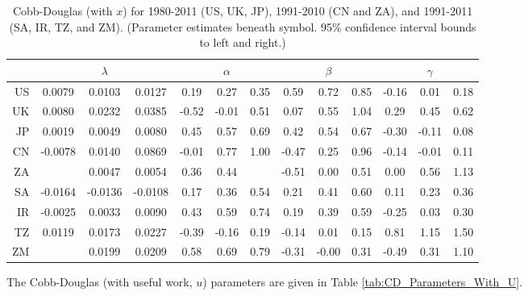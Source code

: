 \documentclass[preprint,authoryear,12pt]{elsarticle}\usepackage{graphicx, color}
\begin{document}
\begin{table}[H]
\begin{center}
\caption{Cobb-Douglas (with $x$) for 1980-2011 (US, UK, JP), 1991-2010 (CN and ZA), and 1991-2011 (SA, IR, TZ, and ZM). (Parameter estimates beneath symbol. 95\% confidence interval bounds to left and right.)}
\label{tab:CD_Parameters_With_X}
{\tiny
\begin{tabular}{r|ccc|ccc|ccc|ccc}
  \hline
 &   & $\lambda$ &   &   & $\alpha$ &   &   & $\beta$ &   &   & $\gamma$ &   \\ 
  \hline
US & 0.0079 & 0.0103 & 0.0127 & 0.19 & 0.27 & 0.35 & 0.59 & 0.72 & 0.85 & -0.16 & 0.01 & 0.18 \\ 
  UK & 0.0080 & 0.0232 & 0.0385 & -0.52 & -0.01 & 0.51 & 0.07 & 0.55 & 1.04 & 0.29 & 0.45 & 0.62 \\ 
  JP & 0.0019 & 0.0049 & 0.0080 & 0.45 & 0.57 & 0.69 & 0.42 & 0.54 & 0.67 & -0.30 & -0.11 & 0.08 \\ 
  CN & -0.0078 & 0.0140 & 0.0869 & -0.01 & 0.77 & 1.00 & -0.47 & 0.25 & 0.96 & -0.14 & -0.01 & 0.11 \\ 
  ZA &  & 0.0047 & 0.0054 & 0.36 & 0.44 &  & -0.51 & 0.00 & 0.51 & 0.00 & 0.56 & 1.13 \\ 
  SA & -0.0164 & -0.0136 & -0.0108 & 0.17 & 0.36 & 0.54 & 0.21 & 0.41 & 0.60 & 0.11 & 0.23 & 0.36 \\ 
  IR & -0.0025 & 0.0033 & 0.0090 & 0.43 & 0.59 & 0.74 & 0.19 & 0.39 & 0.59 & -0.25 & 0.03 & 0.30 \\ 
  TZ & 0.0119 & 0.0173 & 0.0227 & -0.39 & -0.16 & 0.19 & -0.14 & 0.01 & 0.15 & 0.81 & 1.15 & 1.50 \\ 
  ZM &  & 0.0199 & 0.0209 & 0.58 & 0.69 & 0.79 & -0.31 & -0.00 & 0.31 & -0.49 & 0.31 & 1.10 \\ 
   \hline
\end{tabular}
}
\end{center}
\end{table}



The Cobb-Douglas (with useful work, $u$) parameters are given in Table \ref{tab:CD_Parameters_With_U}.
\end{document}
